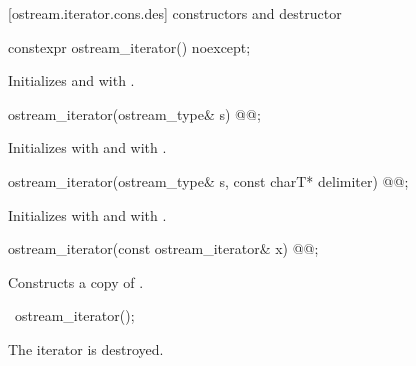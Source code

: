 [ostream.iterator.cons.des]{ constructors and destructor}

\begin{addedblock}
%
\begin{itemdecl}
constexpr ostream_iterator() noexcept;
\end{itemdecl}

\begin{itemdescr}
\pnum
\effects
Initializes  and  with .
\end{itemdescr}
\end{addedblock}

%
\begin{itemdecl}
ostream_iterator(ostream_type& s) @@;
\end{itemdecl}

\begin{itemdescr}
\pnum
\effects
Initializes  with  and  with .
\end{itemdescr}

%
\begin{itemdecl}
ostream_iterator(ostream_type& s, const charT* delimiter) @@;
\end{itemdecl}

\begin{itemdescr}
\pnum
\effects
Initializes  with  and  with .
\end{itemdescr}

%
\begin{itemdecl}
ostream_iterator(const ostream_iterator& x) @@;
\end{itemdecl}

\begin{itemdescr}
\pnum
\effects
Constructs a copy of .
\end{itemdescr}

%
\begin{itemdecl}
~ostream_iterator();
\end{itemdecl}

\begin{itemdescr}
\pnum
\effects
The iterator is destroyed.
\end{itemdescr}

